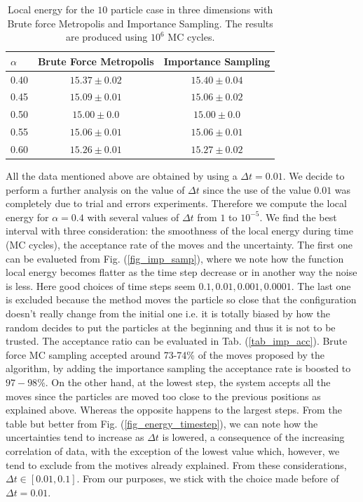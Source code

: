 \begin{table}[H] \centering
	\caption{Local energy for the $10$ particle case in three dimensions with Brute force Metropolis and Importance Sampling. The results are produced using $10^6$ MC cycles.}
	\begin{tabular}{l |c |c } 
		$\alpha $&\hfill \textbf{Brute Force Metropolis} \hfill & \textbf{Importance Sampling} \\ \hline
		0.40 & $15.37\pm 0.02$   & $15.40\pm 0.04$ \\
		0.45 &  $15.09\pm0.01$   & $15.06\pm0.02$  \\
		0.50 & $15.00 \pm 0.0$   &$15.00\pm 0.0$    \\
		0.55 & $15.06 \pm0.01 $  & $15.06 \pm0.01 $  \\
		0.60 & $15.26\pm0.01 $   & $15.27\pm0.02$    
		\\ 
	\end{tabular}
	\label{tab_imp_samp}
\end{table} 
All the data mentioned above are obtained by using a $\Delta t=0.01$. We decide to perform a further analysis on the value of $\Delta t$ since the use of the value $0.01$ was completely due to trial and errors experiments. Therefore we compute the local energy for $\alpha =0.4$ with several values of $\Delta t$ from $1$ to $10^{-5}$. We find the best interval with three consideration: the smoothness of the local energy during time (MC cycles), the acceptance rate of the moves and the uncertainty. The first one can be evalueted from Fig. (\ref{fig_imp_samp}), where we note how the function local energy becomes flatter as the time step decrease or in another way the noise is less. Here good choices of time steps seem $0.1,0.01,0.001,0.0001$. The last one is excluded because the method moves the particle so close that the configuration doesn't really change from the initial one i.e. it is totally biased by how the random decides to put the particles at the beginning and thus it is not to be trusted. The acceptance ratio can be evaluated in Tab. (\ref{tab_imp_acc}). Brute force MC sampling accepted around 73-74\% of the moves proposed by the algorithm, by adding the importance sampling the acceptance rate is boosted to $97-98\%$. On the other hand, at the lowest step, the system accepts all the moves since the particles are moved too close to the previous positions as explained above. Whereas the opposite happens to the largest steps. From the table but better from Fig. (\ref{fig_energy_timestep}), we can note how the uncertainties tend to increase as $\Delta t$ is lowered, a consequence of the increasing correlation of data, with the exception of the lowest value which, however, we tend to exclude from the motives already explained. From these considerations, $\Delta t\in [0.01, 0.1]$. From our purposes, we stick with the choice made before of $\Delta t =0.01$.





